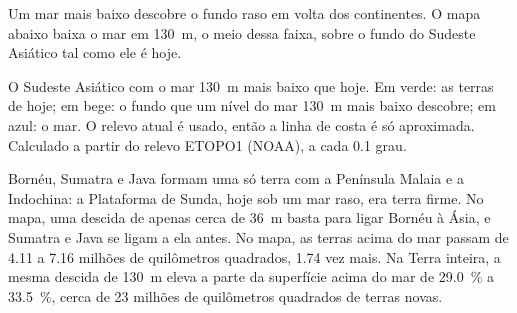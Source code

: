 Um mar mais baixo descobre o fundo raso em volta dos continentes. O mapa
abaixo baixa o mar em \qty{130}{m}, o meio dessa faixa, sobre o fundo do
Sudeste Asiático tal como ele é hoje.

\begin{omfigure}

{\small O Sudeste Asiático com o mar \qty{130}{m} mais baixo que hoje. Em
verde: as terras de hoje; em bege: o fundo que um nível do mar \qty{130}{m}
mais baixo descobre; em azul: o mar. O relevo atual é usado, então a linha
de costa é só aproximada. Calculado a partir do relevo ETOPO1 (NOAA), a
cada 0.1 grau.}
\end{omfigure}

Bornéu, Sumatra e Java formam uma só terra com a Península Malaia e a
Indochina: a Plataforma de Sunda, hoje sob um mar raso, era terra firme. No mapa, uma
descida de apenas cerca de \qty{36}{m} basta para ligar Bornéu à Ásia, e
Sumatra e Java se ligam a ela antes. No mapa,
as terras acima do mar passam de 4.11 a 7.16 milhões de quilômetros
quadrados, 1.74 vez mais. Na Terra inteira, a mesma descida de \qty{130}{m}
eleva a parte da superfície acima do mar de \qty{29.0}{\percent} a
\qty{33.5}{\percent}, cerca de 23 milhões de quilômetros quadrados de terras
novas.

